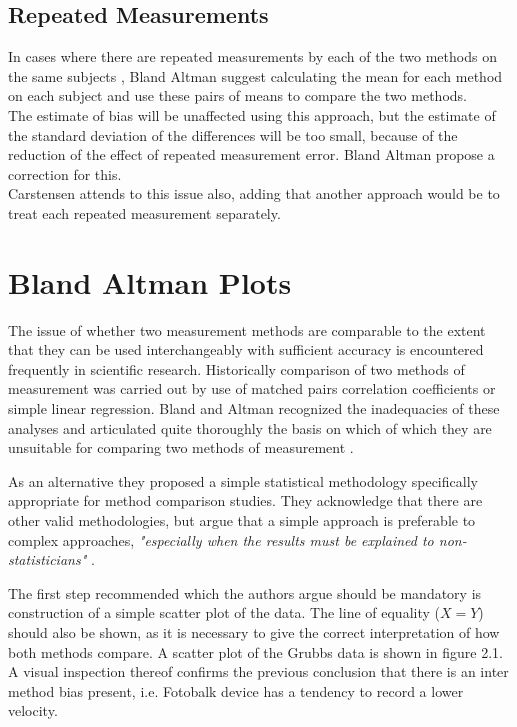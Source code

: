 \documentclass[12pt, a4paper]{report}
\begin{document}
\subsection{Repeated Measurements }
In cases where there are repeated measurements by each of the two
methods on the same subjects , Bland Altman suggest calculating
the mean for each method on each subject and use these pairs of
means to compare the two methods.
\\
The estimate of bias will be unaffected using this approach, but
the estimate of the standard deviation of the differences will be
too small, because of the reduction of the effect of repeated
measurement error. Bland Altman propose a correction for this.
\\
Carstensen attends to this issue also, adding that another
approach would be to treat each repeated measurement separately.







	\section{Bland Altman Plots}
	The issue of whether two measurement methods are comparable to the
	extent that they can be used interchangeably with sufficient
	accuracy is encountered frequently in scientific research.
	Historically comparison of two methods of measurement was carried
	out by use of matched pairs correlation coefficients or simple
	linear regression. Bland and Altman recognized the inadequacies of
	these analyses and articulated quite thoroughly the basis on which
	of which they are unsuitable for comparing two methods of
	measurement \citep*{BA83}.
	
	As an alternative they proposed a simple statistical methodology
	specifically appropriate for method comparison studies. They
	acknowledge that there are other valid methodologies, but argue
	that a simple approach is preferable to complex approaches,
	\emph{"especially when the results must be explained to
		non-statisticians"} \citep*{BA83}.
	
	The first step recommended which the authors argue should be
	mandatory is construction of a simple scatter plot of the data.
	The line of equality ($X=Y$) should also be shown, as it is
	necessary to give the correct interpretation of how both methods
	compare. A scatter plot of the Grubbs data is shown in figure 2.1.
	A visual inspection thereof confirms the previous conclusion that
	there is an inter method bias present, i.e. Fotobalk device has a
	tendency to record a lower velocity.
	
\end{document}

